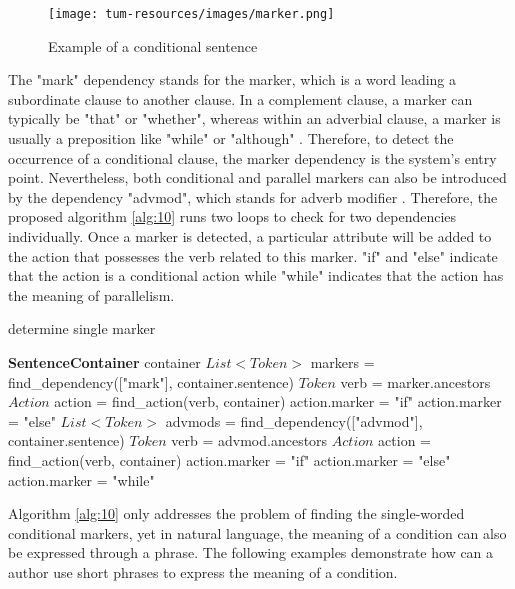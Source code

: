 \begin{figure}[h]
    \centering
    \caption{Example of a conditional sentence}
    \texttt{[image: tum-resources/images/marker.png]}
\end{figure}

The "mark" dependency stands for the marker, which is a word leading a subordinate clause to another clause. In a complement clause, a marker can typically be "that" or "whether", whereas within an adverbial clause, a marker is usually a preposition like "while" or "although" \cite{dependencies_manual}. Therefore, to detect the occurrence of a conditional clause, the marker dependency is the system's entry point. Nevertheless, both conditional and parallel markers can also be introduced by the dependency "advmod", which stands for adverb modiﬁer \cite{t2m_1_main}. Therefore, the proposed algorithm \ref{alg:10} runs two loops to check for two dependencies individually. Once a marker is detected, a particular attribute will be added to the action that possesses the verb related to this marker. "if" and "else" indicate that the action is a conditional action while "while" indicates that the action has the meaning of parallelism. 
 
\begin{algorithm}
\caption{determine single marker}
\label{alg:10}
	\begin{algorithmic} [1]
		\REQUIRE \textbf{SentenceContainer} container
		\STATE $List<Token>$ markers = find\_dependency(["mark"], container.sentence)
		\STATE $Token$ verb = marker.ancestors
		\STATE $Action$ action = find\_action(verb, container)
		\STATE action.marker = "if" 
		\STATE action.marker = "else"
		\ENDIF
		\ENDFOR
		\STATE $List<Token>$ advmods = find\_dependency(["advmod"], container.sentence)
		\STATE $Token$ verb = advmod.ancestors
		\STATE $Action$ action = find\_action(verb, container)
		\STATE action.marker = "if" 
		\STATE action.marker = "else"
		\STATE action.marker = "while"
		\ENDIF
		\ENDFOR
	\end{algorithmic}
\end{algorithm}

Algorithm \ref{alg:10} only addresses the problem of finding the single-worded conditional markers, yet in natural language, the meaning of a condition can also be expressed through a phrase. The following examples demonstrate how can a author use short phrases to express the meaning of a condition. 

